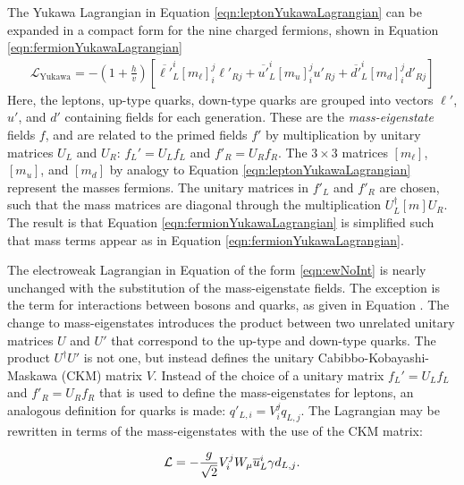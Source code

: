 The Yukawa Lagrangian in Equation \ref{eqn:leptonYukawaLagrangian} can be expanded in a compact form for the nine charged fermions, shown in Equation \ref{eqn:fermionYukawaLagrangian}
\begin{equation}\begin{split}\label{eqn:fermionYukawaLagrangian}
        \mathcal{L}_{\text{Yukawa}}=-\left(1+\frac{h}{v}\right)\left[ \overline{\ell'}_L^i[m_{\ell}]_i^j\ell'_{Rj} + \overline{u'}_L^i[m_{u}]_i^ju'_{Rj} + \overline{d'}_L^i[m_{d}]_i^jd'_{Rj} \right]
\end{split}\end{equation}
Here, the leptons, up-type quarks, down-type quarks are grouped into vectors $\ell'$, $u'$, and $d'$ containing fields for each generation.
These are the \emph{mass-eigenstate} fields $f$, and are related to the primed fields $f'$ by multiplication by unitary matrices $U_L$ and $U_R$: $f_L'=U_Lf_L$ and $f'_R=U_Rf_R$.
The $3\times3$ matrices $[m_{\ell}]$, $[m_{u}]$, and $[m_{d}]$ by analogy to Equation \ref{eqn:leptonYukawaLagrangian} represent the masses fermions.
The unitary matrices in $f'_L$ and $f'_R$ are chosen, such that the mass matrices are diagonal through the multiplication $U^\dagger_L[m]U_R$.
The result is that Equation \ref{eqn:fermionYukawaLagrangian} is simplified such that mass terms appear as in Equation \ref{eqn:fermionYukawaLagrangian}.

The electroweak Lagrangian in Equation of the form \ref{eqn:ewNoInt} is nearly unchanged with the substitution of the mass-eigenstate fields.
The exception is the term for interactions between \W bosons and quarks, as given in Equation \label{eqn:ewLagrangianCc}.
The change to mass-eigenstates introduces the product between two unrelated unitary matrices $U$ and $U'$ that correspond to the up-type and down-type quarks.
The product $U^\dagger U'$ is not one, but instead defines the unitary Cabibbo-Kobayashi-Maskawa (CKM) matrix $V$.
Instead of the choice of a unitary matrix $f_L'=U_Lf_L$ and $f'_R=U_Rf_R$ that is used to define the mass-eigenstates for leptons, an analogous definition for quarks is made: $q'_{L,i}=V_i^jq_{L,j}$.
The Lagrangian may be rewritten in terms of the mass-eigenstates with the use of the CKM matrix:

\begin{equation}\begin{split}
    \mathcal{L}=-\frac{g}{\sqrt{2}}V_i^jW_\mu\overline{u}^i_L\gamma d_{L,j}.
\end{split}\end{equation}

